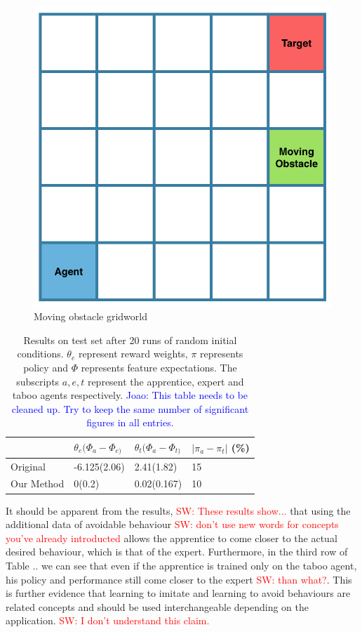 \documentclass[letterpaper]{article}
\newcommand{\sw}[1]{\textcolor{red}{SW: #1}}
\newcommand{\jm}[1]{\textcolor{blue}{Joao: #1}}
\newcommand{\sw}[1]{}
\newcommand{\jm}[1]{}
\begin{document}
\begin{figure}[t]
  \centering
  \includegraphics[width=0.5\columnwidth]{images/gridworld.png}
  \caption{Moving obstacle gridworld 	\label{fig:gridworld}}
\end{figure}
\begin{table}[]
\centering

\label{tab:results}
\begin{tabular}{|l|l|l|l|}
\hline
           & $\theta_e(\Phi_{a}-\Phi_{e)}$& $\theta_t(\Phi_{a}-\Phi_{t)}$ & $|\pi_a - \pi_t|$ (\%) \\ \hline
Original   & -6.125(2.06)        & 2.41(1.82)         & 15                    \\ \hline
Our Method & 0(0.2)              & 0.02(0.167)        & 10                    \\ \hline
\end{tabular}
\caption{Results on test set after 20 runs of random initial conditions. $\theta_e$ represent reward weights, $\pi$ represents policy and $\Phi$ represents feature expectations. The subscripts $a,e,t$ represent the apprentice, expert and taboo agents respectively. \jm{This table needs to be cleaned up. Try to keep the same number of significant figures in all entries.}}
\end{table}
It should be apparent from the results, \sw{These results show...} that using the additional data of avoidable behaviour \sw{don't use new words for concepts you've already introducted} allows the apprentice to 
come closer to the actual desired behaviour, which is that of the expert. Furthermore, in the third row of Table .. we can see that
even if the apprentice is trained only on the taboo agent, his policy and performance still come closer to the expert \sw{than what?}. This is further
evidence that learning to imitate and learning to avoid behaviours are related concepts and should be used interchangeable depending on the application. \sw{I don't understand this claim.}
\end{document}
